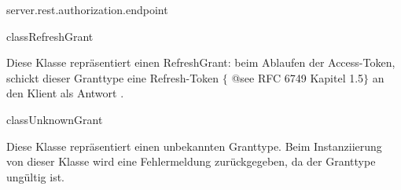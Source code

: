 \begin{texdocpackage}{server.rest.authorization.endpoint}
\begin{texdocclass}{class}{RefreshGrant}
\label{texdoclet:edu.kit.informatik.studyplan.server.rest.authorization.endpoint.RefreshGrant}
\begin{texdocclassintro}
Diese Klasse repräsentiert einen RefreshGrant: beim Ablaufen der Access-Token, schickt dieser Granttype
 eine Refresh-Token $\{$ @see RFC 6749 Kapitel 1.5$\}$ an den Klient als Antwort .\end{texdocclassintro}
\begin{texdocclassconstructors}
\end{texdocclassconstructors}
\begin{texdocclassmethods}
\end{texdocclassmethods}
\end{texdocclass}


\begin{texdocclass}{class}{UnknownGrant}
\label{texdoclet:edu.kit.informatik.studyplan.server.rest.authorization.endpoint.UnknownGrant}
\begin{texdocclassintro}
Diese Klasse repräsentiert einen unbekannten Granttype. Beim Instanziierung von dieser Klasse wird 
 eine Fehlermeldung zurückgegeben, da der Granttype ungültig ist.\end{texdocclassintro}
\begin{texdocclassconstructors}
\end{texdocclassconstructors}
\begin{texdocclassmethods}
\end{texdocclassmethods}
\end{texdocclass}


\end{texdocpackage}




